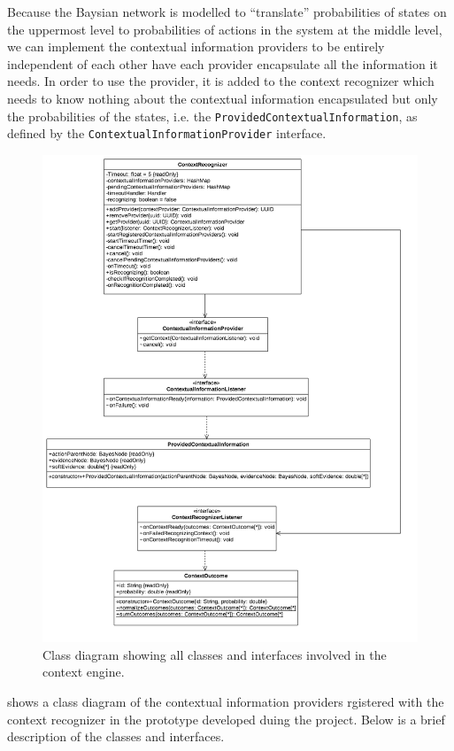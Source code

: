 Because the Baysian network is modelled to ``translate'' probabilities of states on the uppermost level to probabilities of actions in the system at the middle level, we can implement the contextual information providers to be entirely independent of each other have each provider encapsulate all the information it needs.
In order to use the provider, it is added to the context recognizer which needs to know nothing about the contextual information encapsulated but only the probabilities of the states, i.e. the \texttt{ProvidedContextualInformation}, as defined by the \texttt{ContextualInformationProvider} interface.

\begin{figure}[h!]
\centering
\includegraphics[width=\textwidth]{images/uml-context-engine}
\caption{Class diagram showing all classes and interfaces involved in the context engine.}
\label{fig:implementation:context-engine}
\end{figure}

 shows a class diagram of the contextual information providers rgistered with the context recognizer in the prototype developed duing the project. Below is a brief description of the classes and interfaces.

